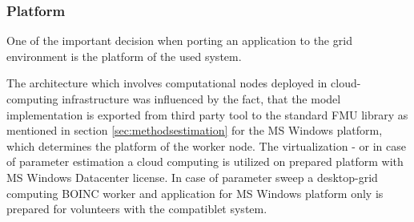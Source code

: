 %
%

\subsubsection{Platform}

One of the important decision when porting an application to the grid environment is the platform of the used system. %

The architecture which involves computational nodes deployed in cloud-computing infrastructure was influenced by the fact, that the model implementation is exported from third party tool to the standard FMU library as mentioned in section \ref{sec:methodsestimation} for the MS Windows platform, which determines the platform of the worker node. The virtualization - or in case of parameter estimation a cloud computing is utilized on prepared platform with MS Windows Datacenter license. In case of parameter sweep a desktop-grid computing BOINC worker and application for MS Windows platform only is prepared for volunteers with the compatiblet system. 

